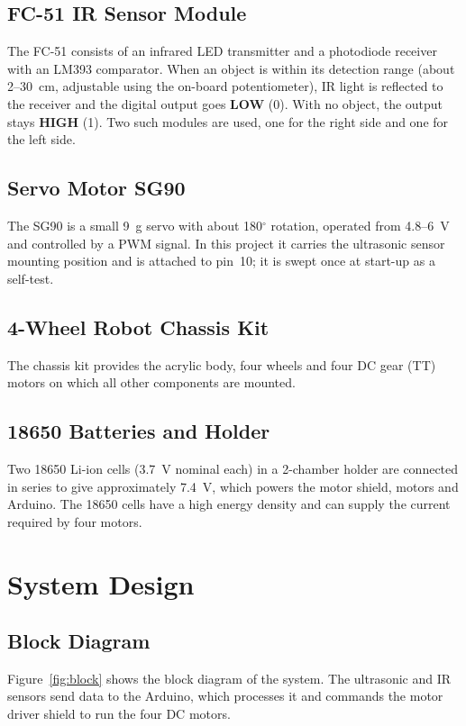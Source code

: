 \documentclass[12pt,a4paper]{article}
\begin{document}
\subsection{FC-51 IR Sensor Module}
The FC-51 consists of an infrared LED transmitter and a photodiode receiver with an LM393 comparator. When an object is within its detection range (about 2--30~cm, adjustable using the on-board potentiometer), IR light is reflected to the receiver and the digital output goes \textbf{LOW} (0). With no object, the output stays \textbf{HIGH} (1). Two such modules are used, one for the right side and one for the left side.

\subsection{Servo Motor SG90}
The SG90 is a small 9~g servo with about 180$^\circ$ rotation, operated from 4.8--6~V and controlled by a PWM signal. In this project it carries the ultrasonic sensor mounting position and is attached to pin~10; it is swept once at start-up as a self-test.

\subsection{4-Wheel Robot Chassis Kit}
The chassis kit provides the acrylic body, four wheels and four DC gear (TT) motors on which all other components are mounted.

\subsection{18650 Batteries and Holder}
Two 18650 Li-ion cells (3.7~V nominal each) in a 2-chamber holder are connected in series to give approximately 7.4~V, which powers the motor shield, motors and Arduino. The 18650 cells have a high energy density and can supply the current required by four motors.

\section{System Design}

\subsection{Block Diagram}
Figure~\ref{fig:block} shows the block diagram of the system. The ultrasonic and IR sensors send data to the Arduino, which processes it and commands the motor driver shield to run the four DC motors.
\end{document}
